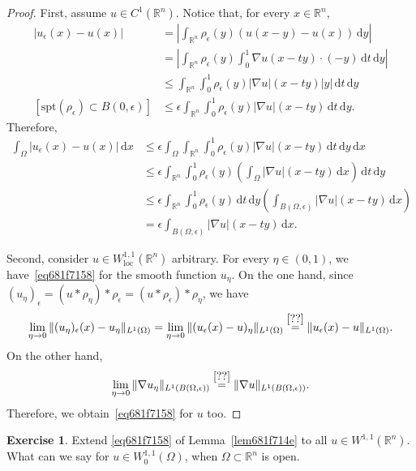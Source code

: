 \documentclass[a4paper,9pt]{amsart}
\newcommand{\R}{\mathbb{R}}	%
\newcommand{\did}{\,\mathrm{d}}	%
\newcommand{\spt}{\mathrm{spt}}
\newcommand{\loc}{\mathrm{loc}}
\newcommand{\grad}{\nabla}
\theoremstyle{plain}
\theoremstyle{definition}
\newtheorem{exercise}[proposition]{Exercise}%
\theoremstyle{remark}
\begin{document}
\begin{proof}
	First, assume $u\in C^1(\R^n)$.
	Notice that, for every $x\in\R^n$, 
	\begin{align}
		|u_\epsilon (x) - u(x)|
		&= \left| \int_{\R^n} \rho_\epsilon(y) (u(x-y)-u(x)) \did y \right| \\
		&= \left| \int_{\R^n} \rho_\epsilon(y) \int_0^1 \grad u(x-ty)\cdot (-y) \did t \did y \right| \\
		&\le \int_{\R^n}\int_0^1 \rho_\epsilon(y) |\grad u|(x-ty) |y| \did t \did y \\
	[\spt(\rho_\epsilon) \subset B(0,\epsilon)]
		&\le \epsilon \int_{\R^n}\int_0^1 \rho_\epsilon(y) |\grad u|(x-ty) \did t \did y .
	\end{align}
	Therefore,
	\begin{align}
		\int_\Omega |u_\epsilon (x) - u(x)|\did x 
		&\le \epsilon \int_\Omega \int_{\R^n}\int_0^1 \rho_\epsilon(y) |\grad u|(x-ty) \did t \did y \did x \\
		&\le  \epsilon \int_{\R^n}\int_0^1 \rho_\epsilon(y) \left(\int_\Omega|\grad u|(x-ty)\did x\right) \did t \did y \\
		&\le \epsilon \int_{\R^n}\int_0^1 \rho_\epsilon(y) \did t \did y \left(\int_{B(\Omega,\epsilon)}|\grad u|(x-ty)\did x\right)\\
		&= \epsilon \int_{B(\Omega,\epsilon)}|\grad u|(x-ty)\did x .
	\end{align}
	
	Second, consider $u\in W^{1,1}_\loc(\R^n)$ arbitrary.
	For every $\eta\in(0,1)$, we have~\eqref{eq681f7158} for the smooth function $u_\eta$.
	On the one hand, since $(u_\eta)_\epsilon = (u*\rho_\eta)*\rho_\epsilon = (u*\rho_\epsilon)*\rho_\eta$, we have
	\begin{equation}
		\lim_{\eta\to0} \| (u_\eta)_\epsilon(x) - u_\eta \|_{L^1(\Omega)}
		= \lim_{\eta\to0} \| ( u_\epsilon(x) - u)_\eta \|_{L^1(\Omega)}
		\overset{\eqref{??}}= \| u_\epsilon(x) - u \|_{L^1(\Omega)} .
	\end{equation}
	On the other hand, 
	\begin{equation}
		\lim_{\eta\to0} \| \grad u_\eta \|_{L^1(B(\Omega,\epsilon))}
		\overset{\eqref{??}}= \| \grad u \|_{L^1(B(\Omega,\epsilon))} .
	\end{equation}
	Therefore, we obtain~\eqref{eq681f7158} for $u$ too.
\end{proof}

\begin{exercise}
	Extend \eqref{eq681f7158} of Lemma~\ref{lem681f714e} to all $u\in W^{1,1}(\R^n)$.
	What can we say for $u\in W^{1,1}_0(\Omega)$, when $\Omega\subset\R^n$ is open.
\end{exercise}
\end{document}
